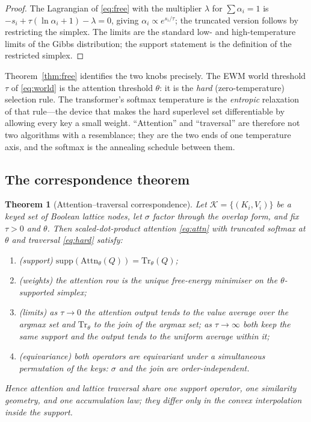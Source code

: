\documentclass[11pt,a4paper]{article}
\newtheorem{theorem}[principle]{Theorem}
\theoremstyle{remark}
\newcommand{\supp}{\ensuremath{\mathrm{supp}}}         %
\newcommand{\Attn}{\ensuremath{\mathrm{Attn}}}          %
\newcommand{\Trv}{\ensuremath{\mathrm{Tr}}}             %
\newcommand{\sigm}{\ensuremath{\sigma}}                 %
\begin{document}
\begin{proof}
The Lagrangian of \eqref{eq:free} with the multiplier $\lambda$ for
$\sum\alpha_i=1$ is $-s_i+\tau(\ln\alpha_i+1)-\lambda=0$, giving
$\alpha_i\propto e^{s_i/\tau}$; the truncated version follows by restricting the
simplex. The limits are the standard low- and high-temperature limits of the
Gibbs distribution; the support statement is the definition of the restricted
simplex.
\end{proof}

Theorem~\ref{thm:free} identifies the two knobs precisely. The EWM world
threshold $\tau$ of \eqref{eq:world} is the attention threshold $\theta$: it is
the \emph{hard} (zero-temperature) selection rule. The transformer's softmax
temperature is the \emph{entropic} relaxation of that rule---the device that
makes the hard superlevel set differentiable by allowing every key a small
weight. ``Attention'' and ``traversal'' are therefore not two algorithms with a
resemblance; they are the two ends of one temperature axis, and the softmax is
the annealing schedule between them.

\subsection{The correspondence theorem}

\begin{theorem}[Attention--traversal correspondence]
\label{thm:correspondence}
Let $\mathcal{K}=\{(K_i,V_i)\}$ be a keyed set of Boolean lattice nodes, let
$\sigm$ factor through the overlap form, and fix $\tau>0$ and $\theta$. Then
scaled-dot-product attention \eqref{eq:attn} with truncated softmax at
$\theta$ and traversal \eqref{eq:hard} satisfy:
\begin{enumerate}[leftmargin=*,nosep]
  \item \emph{(support)} $\supp(\Attn_\theta(Q))=\Trv_\theta(Q)$;
  \item \emph{(weights)} the attention row is the unique free-energy minimiser
    on the $\theta$-supported simplex;
  \item \emph{(limits)} as $\tau\to0$ the attention output tends to the value
    average over the argmax set and $\Trv_\theta$ to the join of the argmax
    set; as $\tau\to\infty$ both keep the same support and the output tends to
    the uniform average within it;
  \item \emph{(equivariance)} both operators are equivariant under a
    simultaneous permutation of the keys: $\sigm$ and the join are
    order-independent.
\end{enumerate}
Hence attention and lattice traversal share one support operator, one
similarity geometry, and one accumulation law; they differ only in the convex
interpolation inside the support.
\end{theorem}
\end{document}
